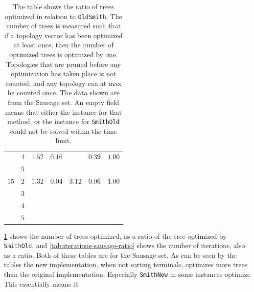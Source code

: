 \begin{table}[htbp]
{\begin{tabular}{ccccccc}
         & $4$ & $1.52$ & $0.16$     &          & $0.39$       & $1.00$   \\
         & $5$ &        &            &          &              &          \\
    \cmidrule(r){1-2}
    $15$ & $2$ & $1.32$ & $0.04$     & $3.12$   & $0.06$       & $1.00$   \\
         & $3$ &        &            &          &              &          \\
         & $4$ &        &            &          &              &          \\
         & $5$ &        &            &          &              &          \\
    \bottomrule
  \end{tabular}
  }
  \caption[Tree-exploration ratio for Sausage]{The table shows the ratio of
    trees optimized in relation to \texttt{OldSmith}. The number of trees is
    measured such that if a topology vector has been optimized at least once,
    then the number of optimized trees is optimized by one. Topologies that are
    pruned before any optimization has taken place is not counted, and any
    topology can at max be counted once. The data shown are from the Sausage
    set. An empty field means that either the instance for that method, or the
    instance for \texttt{SmithOld} could not be solved within the time limit.\label{tab:trees-sausage-ratio}}
\end{table}
%
\cref{tab:trees-sausage-ratio} shows the number of trees optimized, as a ratio
of the tree optimized by \texttt{SmithOld}, and
\cref{tab:iterations-sausage-ratio} shows the number of iterations, also as a
ratio. Both of these tables are for the Sausage set. As can be seen by the
tables the new implementation, when not sorting terminals, optimizes more trees
than the original implementation. Especially \texttt{SmithNew} in some instances
optimize  
This essentially means it 
%
